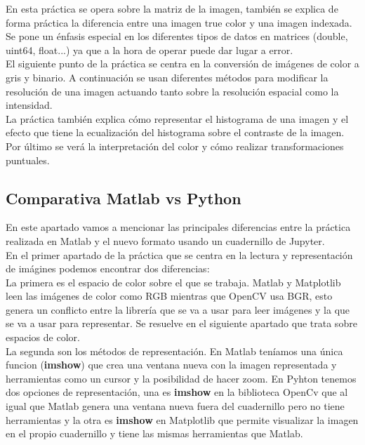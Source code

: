 \documentclass[a4paper,12pt]{report}
\begin{document}
En esta práctica se opera sobre la matriz de la imagen, también se explica de forma práctica la diferencia entre una imagen true color y una imagen indexada. Se pone un énfasis especial en los diferentes tipos de datos en matrices (double, uint64, float...) ya que a la hora de operar puede dar lugar a error.\\

El siguiente punto de la práctica se centra en la conversión de imágenes de color a gris y binario. A continuación se usan diferentes métodos para modificar la resolución de una imagen actuando tanto sobre la resolución espacial como la intensidad.\\

La práctica también explica cómo representar el histograma de una imagen y el efecto que tiene la ecualización del histograma sobre el contraste de la imagen.\\

Por último se verá la interpretación del color y cómo realizar transformaciones puntuales.\\

\subsection{Comparativa Matlab vs Python}

En este apartado vamos a mencionar las principales diferencias entre la práctica realizada en Matlab y el nuevo formato usando un cuadernillo de Jupyter.\\

En el primer apartado de la práctica que se centra en la lectura y representación de imágines podemos encontrar dos diferencias:\\

La primera es el espacio de color sobre el que se trabaja. Matlab y Matplotlib leen las imágenes de color como RGB mientras que OpenCV usa BGR, esto genera un conflicto entre la librería que se va a usar para leer imágenes y la que se va a usar para representar. Se resuelve en el siguiente apartado que trata sobre espacios de color.\\

La segunda son los métodos de representación. En Matlab teníamos una única funcion (\textbf{imshow}) que crea una ventana nueva con la imagen representada y herramientas como un cursor y la posibilidad de hacer zoom. En Pyhton tenemos dos opciones de representación, una es \textbf{imshow} en la biblioteca  OpenCv que al igual que Matlab genera una ventana nueva fuera del cuadernillo pero no tiene herramientas y la otra es \textbf{imshow} en Matplotlib que permite visualizar la imagen en el propio cuadernillo y tiene las mismas herramientas que Matlab.\\
\end{document}
